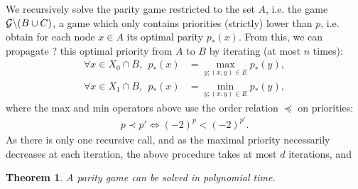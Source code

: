 \documentclass{article}
\newtheorem{theorem}{Theorem}
\def\G{{\cal G}}
\begin{document}
We recursively solve the parity game restricted to the set $A$, i.e. the game $\G \backslash (B \cup C)$, a game which only contains priorities (strictly) lower than $p$, i.e. obtain for each node $x \in A$ its optimal parity $p_*(x)$. From this, we can propagate ? this optimal priority from $A$ to $B$ by iterating (at most $n$ times):
\begin{align}
  \forall x \in X_0 \cap B, ~~ p_*(x) &= \max_{y;(x,y)\in E} p_*(y), \\
  \forall x \in X_1 \cap B, ~~ p_*(x) &= \min_{y;(x,y)\in E} p_*(y),
\end{align}
where the max and min operators above use the order relation $\preceq$ on priorities:
\begin{align}
  p \prec p' \Leftrightarrow (-2)^{p}<(-2)^{p'}.  
\end{align}
As there is only one recursive call, and as the maximal priority necessarily decreases at each iteration, the above procedure takes at most $d$ iterations, and
\begin{theorem}
A parity game can be solved in polynomial time.
\end{theorem}



 
\end{document}

